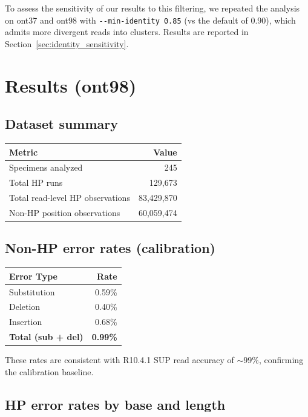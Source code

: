 \documentclass[11pt]{article}
\begin{document}
To assess the sensitivity of our results to this filtering, we repeated the
analysis on ont37 and ont98 with \texttt{-{}-min-identity~0.85} (vs the
default of 0.90), which admits more divergent reads into clusters. Results are
reported in Section~\ref{sec:identity_sensitivity}.


\section{Results (ont98)}

\subsection{Dataset summary}

\begin{table}[h]
\centering
\begin{tabular}{lr}
\toprule
Metric & Value \\
\midrule
Specimens analyzed & 245 \\
Total HP runs & 129,673 \\
Total read-level HP observations & 83,429,870 \\
Non-HP position observations & 60,059,474 \\
\bottomrule
\end{tabular}
\end{table}

\subsection{Non-HP error rates (calibration)}

\begin{table}[h]
\centering
\begin{tabular}{lr}
\toprule
Error Type & Rate \\
\midrule
Substitution & 0.59\% \\
Deletion & 0.40\% \\
Insertion & 0.68\% \\
\textbf{Total (sub + del)} & \textbf{0.99\%} \\
\bottomrule
\end{tabular}
\end{table}

These rates are consistent with R10.4.1 SUP read accuracy of ${\sim}99\%$,
confirming the calibration baseline.

\subsection{HP error rates by base and length}
\end{document}
